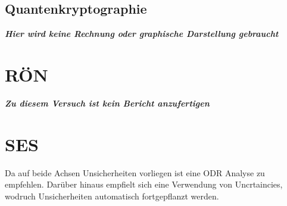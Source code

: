 \documentclass[a4paper,12pt]{article}
\begin{document}
\subsection{Quantenkryptographie}
\textbf{\textit{Hier wird keine Rechnung oder graphische Darstellung gebraucht}}



\section{RÖN}
\textbf{\textit{Zu diesem Versuch ist kein Bericht anzufertigen}}



\section{SES}

\begin{center}
\begin{tcolorbox}[colback=gray!20, colframe=red, width=0.8\textwidth, boxrule=1pt, arc=1mm]
Da auf beide Achsen Unsicherheiten vorliegen ist eine ODR Analyse zu empfehlen. Darüber hinaus empfielt sich eine Verwendung von Uncrtaincies, wodruch Unsicherheiten automatisch fortgepflanzt werden.
\end{tcolorbox}
\end{center}
\end{document}
